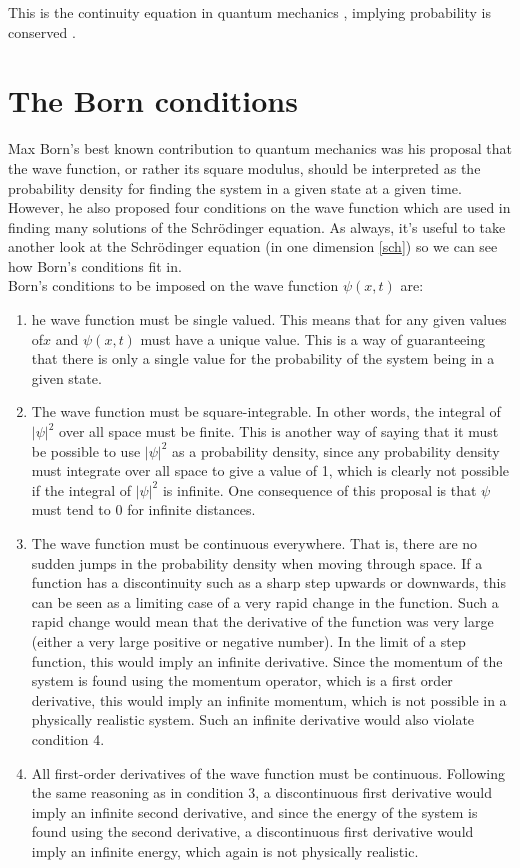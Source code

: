   This is the continuity equation in quantum mechanics , implying probability is conserved .
  \section{ The Born conditions}
  Max Born’s best known contribution to quantum mechanics was his proposal that the wave function, or rather its square modulus, should be interpreted as the probability density for finding the system in a given state at a given time. However, he also proposed four conditions on the wave function which are used in finding many solutions of the Schr\"{o}dinger equation. As always, it’s useful to take another look at the Schr\"{o}dinger equation (in one dimension \eqref{sch}) so we can see how  Born's conditions fit in.\\
  Born’s conditions to be imposed on the wave function $\psi(x,t)$ are:
  \begin{enumerate}
  	\item he wave function must be single valued. This means that for any given values of$x$ and $\psi(x,t)$  must have a unique value. This is a way of guaranteeing that there is only a single value for the probability of the system being in a given state. 
  	\item The wave function must be square-integrable. In other words, the integral of $ | \psi| ^2$ over all space must be finite. This is another way of saying that it must be possible to use $ | \psi| ^2$ as a probability density, since any probability density must integrate over all space to give a value of 1, which is clearly not possible if the integral of $ | \psi| ^2$ is infinite. One consequence of this proposal is that $ \psi$ must tend to 0 for infinite distances. 
  	\item The wave function must be continuous everywhere. That is, there are no sudden jumps in the probability density when moving through space. If a function has a discontinuity such as a sharp step upwards or downwards, this can be seen as a limiting case of a very rapid change in the function. Such a rapid change would mean that the derivative of the function was very large (either a very large positive or negative number). In the limit of a step function, this would imply an infinite derivative. Since the momentum of the system is found using the momentum operator, which is a first order derivative, this would imply an infinite momentum, which is not possible in a physically realistic system. Such an infinite derivative would also violate condition 4. 
  	\item All first-order derivatives of the wave function must be continuous. Following the same reasoning as in condition 3, a discontinuous first derivative would imply an infinite second derivative, and since the energy of the system is found using the second derivative, a discontinuous first derivative would imply an infinite energy, which again is not physically realistic. 
  \end{enumerate}

